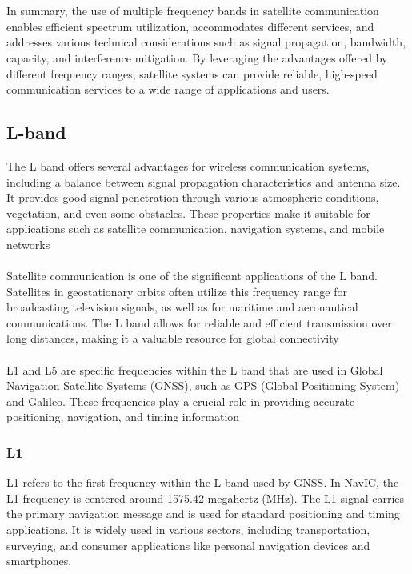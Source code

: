 \\
\\
In summary, the use of multiple frequency bands in satellite communication enables efficient spectrum utilization, accommodates different services, and addresses various technical considerations such as signal propagation, bandwidth, capacity, and interference mitigation. By leveraging the advantages offered by different frequency ranges, satellite systems can provide reliable, high-speed communication services to a wide range of applications and users.







\subsection{L-band}
The L band offers several advantages for wireless communication systems, including a balance between signal propagation characteristics and antenna size. It provides good signal penetration through various atmospheric conditions, vegetation, and even some obstacles. These properties make it suitable for applications such as satellite communication, navigation systems, and mobile networks
\\
\\
Satellite communication is one of the significant applications of the L band. Satellites in geostationary orbits often utilize this frequency range for broadcasting television signals, as well as for maritime and aeronautical communications. The L band allows for reliable and efficient transmission over long distances, making it a valuable resource for global connectivity
\\
\\
L1 and L5 are specific frequencies within the L band that are used in Global Navigation Satellite Systems (GNSS), such as GPS (Global Positioning System) and Galileo. These frequencies play a crucial role in providing accurate positioning, navigation, and timing information
\\
\subsubsection{L1} 
L1 refers to the first frequency within the L band used by GNSS. In NavIC, the L1 frequency is centered around 1575.42 megahertz (MHz). The L1 signal carries the primary navigation message and is used for standard positioning and timing applications. It is widely used in various sectors, including transportation, surveying, and consumer applications like personal navigation devices and smartphones.
